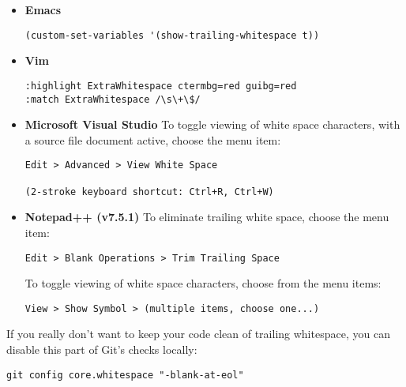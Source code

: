 \begin{itemize}
\item \textbf{Emacs}
\begin{verbatim}
(custom-set-variables '(show-trailing-whitespace t))
\end{verbatim}

\item \textbf{Vim}
\begin{verbatim}
:highlight ExtraWhitespace ctermbg=red guibg=red
:match ExtraWhitespace /\s\+\$/
\end{verbatim}

\item \textbf{Microsoft Visual Studio}
To toggle viewing of white space characters, with a source file document active,
choose the menu item:

\begin{verbatim}
Edit > Advanced > View White Space

(2-stroke keyboard shortcut: Ctrl+R, Ctrl+W)
\end{verbatim}

\item \textbf{Notepad++ (v7.5.1)}
To eliminate trailing white space, choose the menu item:

\begin{verbatim}
Edit > Blank Operations > Trim Trailing Space
\end{verbatim}

To toggle viewing of white space characters, choose from the
menu items:

\begin{verbatim}
View > Show Symbol > (multiple items, choose one...)
\end{verbatim}

\end{itemize}

If you really don't want to keep your code clean of trailing whitespace, you can
disable this part of Git's checks locally:

\begin{verbatim}
git config core.whitespace "-blank-at-eol"
\end{verbatim}


